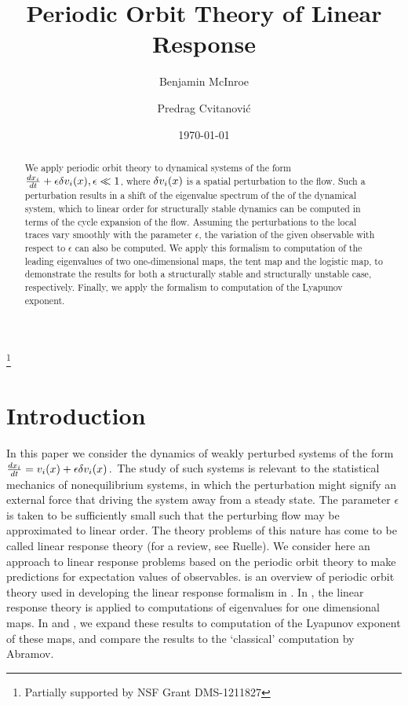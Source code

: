 \documentclass[aps,pre,
                showpacs,
                twocolumn,
                groupedaddress,
                superscriptaddress,
                floatfix]{revtex4-1}
\begin{document}
\title{Periodic Orbit Theory of Linear Response}
\author{Benjamin McInroe}
\author{Predrag Cvitanovi\'c}
\thanks{Partially supported by NSF Grant DMS-1211827}

\date{\today}

\begin{abstract}
We apply periodic orbit theory to dynamical systems of
the form $\frac{dx_{i}}{dt}+\epsilon \delta v_{i}(x), \epsilon \ll 1$,
where $\delta v_{i}(x)$ is a spatial perturbation to the flow. Such a
perturbation results in a shift of the eigenvalue spectrum of the
{\evOper} of the dynamical system, which to linear order for
structurally stable dynamics can be computed in terms of the cycle
expansion of the flow. Assuming the perturbations to the local traces
vary smoothly with the parameter $\epsilon$, the variation of the
 given observable with respect to $\epsilon$ can
also be computed. We apply this formalism to computation of the leading
eigenvalues of two one-dimensional maps, the tent map and the logistic
map, to demonstrate the results for both a structurally stable and
structurally unstable case, respectively. Finally, we apply the formalism
to computation of the Lyapunov exponent.
\end{abstract}

\maketitle



\section{Introduction}
\label{sect:intro}

In this paper we consider the dynamics of weakly perturbed systems of
the form
\(
\frac{dx_{i}}{dt}=v_{i}(x) + \epsilon \delta v_{i}(x)
\,.
\) %
The study of such systems is relevant to the statistical mechanics of
nonequilibrium systems, in which the perturbation might signify an
external force that driving the system away from a steady state. The
parameter $\epsilon$ is taken to be sufficiently small such that the
perturbing flow may be approximated to linear order. The
theory problems of this nature has come to be
called linear response theory (for a review, see Ruelle).
We consider here an
approach to linear response problems based on the periodic
orbit theory to make predictions for expectation values of
observables.   is an overview of periodic orbit
theory used in developing the linear response formalism in
. In , the linear response
theory is applied to computations of eigenvalues for one dimensional
maps. In  and , we expand these
results to computation of the Lyapunov exponent of these maps, and
compare the results to the `classical' computation by
Abramov.
\end{document}
